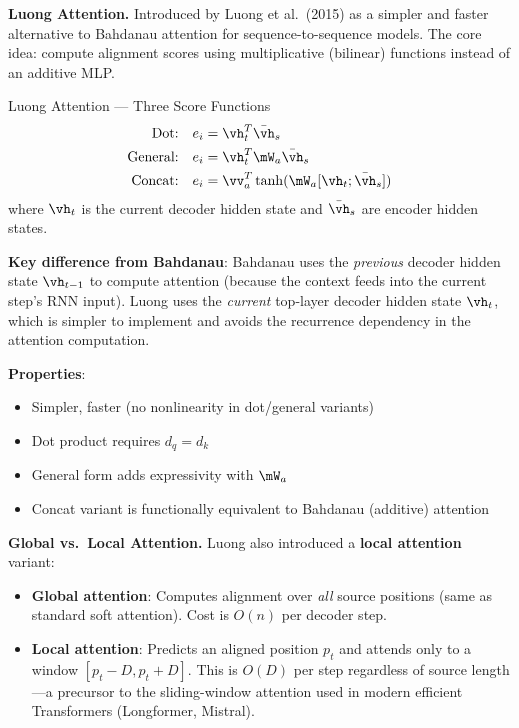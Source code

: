 \textbf{Luong Attention.} Introduced by Luong et al.\ (2015) as a simpler and faster alternative to Bahdanau attention for sequence-to-sequence models. The core idea: compute alignment scores using multiplicative (bilinear) functions instead of an additive MLP.

\begin{mathresult}{Luong Attention --- Three Score Functions}
\begin{align}
\text{Dot:} \quad e_i &= \vh_t^T \bar{\vh}_s \label{eq:luong_dot} \\
\text{General:} \quad e_i &= \vh_t^T \mW_a \bar{\vh}_s \label{eq:luong_general} \\
\text{Concat:} \quad e_i &= \vv_a^T \tanh(\mW_a [\vh_t ; \bar{\vh}_s]) \label{eq:luong_concat}
\end{align}
where $\vh_t$ is the current decoder hidden state and $\bar{\vh}_s$ are encoder hidden states.
\end{mathresult}

\textbf{Key difference from Bahdanau}: Bahdanau uses the \emph{previous} decoder hidden state $\vh_{t-1}$ to compute attention (because the context feeds into the current step's RNN input). Luong uses the \emph{current} top-layer decoder hidden state $\vh_t$, which is simpler to implement and avoids the recurrence dependency in the attention computation.

\textbf{Properties}:
\begin{itemize}
    \item Simpler, faster (no nonlinearity in dot/general variants)
    \item Dot product requires $d_q = d_k$
    \item General form adds expressivity with $\mW_a$
    \item Concat variant is functionally equivalent to Bahdanau (additive) attention
\end{itemize}

\textbf{Global vs.\ Local Attention.} Luong also introduced a \textbf{local attention} variant:
\begin{itemize}
    \item \textbf{Global attention}: Computes alignment over \emph{all} source positions (same as standard soft attention). Cost is $O(n)$ per decoder step.
    \item \textbf{Local attention}: Predicts an aligned position $p_t$ and attends only to a window $[p_t - D, p_t + D]$. This is $O(D)$ per step regardless of source length---a precursor to the sliding-window attention used in modern efficient Transformers (Longformer, Mistral).
\end{itemize}

